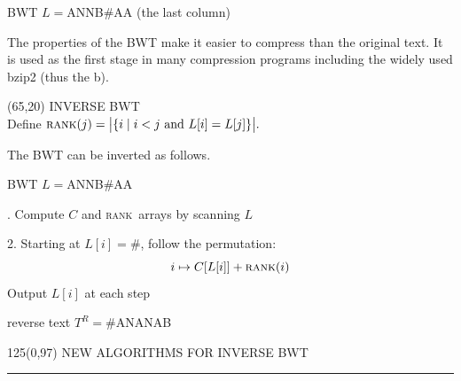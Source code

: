 \documentclass[a4paper]{article} %
\newcommand{\eos}{\#}
\newcommand{\rank}{\textsc{rank}}
\begin{document}
\begin{textblock}{60}
{ BWT $L={}$ANNB\eos AA (the last column)
\vspace{3mm}
}

\footnotesize The properties of the BWT make it easier to
compress than the original text. It is used as the first stage in many
compression programs including the widely used bzip2 (thus the b).

\end{textblock} 

\begin{textblock}{60}(65,20)
  {\sffamily\normalsize{\color{sciorange}INVERSE BWT}}\vspace{1mm}\\
  \footnotesize 
  Define
  $
    \rank(j)=\big|\{i \mid i<j \textrm{ and }
    L[i]=L[j]\}\big|.
  $

The BWT can be inverted as follows.
\vspace{3mm}

\scriptsize\sffamily
{} BWT $L={}$ANNB\eos AA
\vspace{2mm}

\quad\begin{minipage}{55mm}
\scriptsize{}. Compute $C$ and \rank\ arrays by scanning $L$
\scriptsize\sffamily
\begin{center}
\hspace*{-5mm}  
\end{center}
2. Starting at $L[i]={}$\eos, follow the permutation:
\[
i \mapsto C[L[i]]+\rank(i)
\]
\hspace{2.3mm}Output $L[i]$ at each step
\end{minipage}
\vspace{2mm}

\scriptsize\sffamily
{} reverse text $T^R={}$\eos ANANAB

\end{textblock}



\begin{textblock}{125}(0,97)
\sffamily\normalsize{\color{sciorange}NEW ALGORITHMS FOR INVERSE BWT}\small\\
\rule[3mm]{125mm}{0.1pt}
\end{textblock} 
\end{document}
